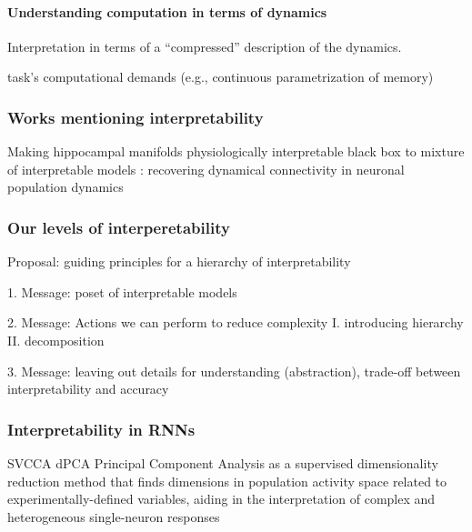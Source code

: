 \documentclass{article}
\theoremstyle{definition} \newtheorem{definition}{Definition}  \newtheorem{example}{Example}
\theoremstyle{remark} \newtheorem{remark}{Remark}
\newcounter{ct}
\begin{document}
\paragraph{Understanding computation in terms of dynamics}
Interpretation in terms of a ``compressed'' description of the dynamics.

task's computational demands (e.g., continuous parametrization of memory)



\subsubsection{Works mentioning interpretability}
\citep{whiteway2019interpretable}
\citep{kar2022interpretability}
 Making hippocampal manifolds physiologically interpretable \citep{esparza2023interpretable}
black box to mixture of interpretable models \citep{ghosh2023blackbox}
\citep{schneider2023learnable}
\citep{brenner2024almost}
\citep{menier2025interpretable}
\citep{nonnenmacher2017extracting}
\citep{zhang2025netformer}: recovering dynamical connectivity in neuronal population dynamics
\citep{klindt2023identifying,klindt2025superposition}

\subsubsection{Our levels of interperetability}
Proposal: guiding principles for a hierarchy of interpretability

1. Message: poset of interpretable models

2. Message: Actions we can perform to reduce complexity
I. introducing hierarchy 
\citep{Vermani2024b}
\citep{geadah2024parsing, geadah2025modeling}
II. decomposition

3. Message: leaving out details for understanding (abstraction), trade-off between interpretability and accuracy


\subsubsection{Interpretability in RNNs}
SVCCA\citep{raghu2017svcca}
dPCA\citep{kobak2016demixed} Principal Component Analysis as a supervised dimensionality reduction method that finds dimensions in population activity space related to experimentally-defined variables, aiding in the interpretation of complex and heterogeneous single-neuron responses
\end{document}
